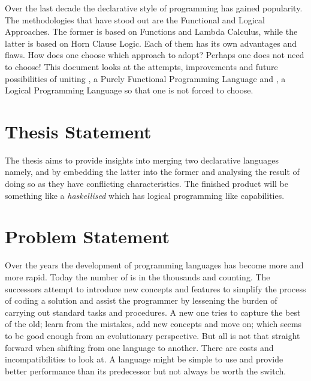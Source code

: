 \documentclass[thesis-solanki.tex]{subfiles}
\begin{document}
Over the last decade the declarative style of programming has gained popularity.
The methodologies that have stood out are the Functional and Logical Approaches.
The former is based on Functions and Lambda Calculus, while the latter is based on Horn Clause Logic.
Each of them has its own advantages and ﬂaws.
How does one choose which approach to adopt?
Perhaps one does not need to choose!
This document looks at the attempts, improvements and future possibilities of uniting , a Purely
Functional Programming Language and , a Logical Programming Language so that one is not forced to
choose.



\section{Thesis Statement}

The thesis aims to provide insights into merging two declarative languages namely,  and
 by embedding the latter into the former and analysing the result of doing so as they have conflicting
characteristics.
The finished product will be something like a \textit{haskellised}  which has logical programming like
capabilities.


\section{Problem Statement}

Over the years the development of programming languages has become more and more rapid.
Today the number of is in the thousands and counting.
The successors attempt to introduce new concepts and features to simplify the process of coding a solution and assist
the programmer by lessening the burden of carrying out standard tasks and procedures.
A new one tries to capture the best of the old; learn from the mistakes, add new concepts and move on; which seems to be
good enough from an evolutionary perspective.
But all is not that straight forward when shifting from one language to another.
There are costs and incompatibilities to look at.
A language might be simple to use and provide better performance than its predecessor but not always be worth the
switch.
\end{document}
